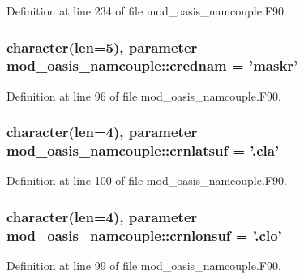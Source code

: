 Definition at line 234 of file mod\+\_\+oasis\+\_\+namcouple.\+F90.

\hypertarget{classmod__oasis__namcouple_a161fc23acf442c75c9d6ba7758937d59}{
\subsubsection[{crednam}]{\setlength{\rightskip}{0pt plus 5cm}character(len=5), parameter mod\+\_\+oasis\+\_\+namcouple\+::crednam = 'maskr'\hspace{0.3cm}{\ttfamily [private]}}}\label{classmod__oasis__namcouple_a161fc23acf442c75c9d6ba7758937d59}


Definition at line 96 of file mod\+\_\+oasis\+\_\+namcouple.\+F90.

\hypertarget{classmod__oasis__namcouple_acdc7f0d582616ee9e18470aad433ed3a}{
\subsubsection[{crnlatsuf}]{\setlength{\rightskip}{0pt plus 5cm}character(len=4), parameter mod\+\_\+oasis\+\_\+namcouple\+::crnlatsuf = '.cla'\hspace{0.3cm}{\ttfamily [private]}}}\label{classmod__oasis__namcouple_acdc7f0d582616ee9e18470aad433ed3a}


Definition at line 100 of file mod\+\_\+oasis\+\_\+namcouple.\+F90.

\hypertarget{classmod__oasis__namcouple_ae56f031c6d9a819a39fe5170f42d7ce1}{
\subsubsection[{crnlonsuf}]{\setlength{\rightskip}{0pt plus 5cm}character(len=4), parameter mod\+\_\+oasis\+\_\+namcouple\+::crnlonsuf = '.clo'\hspace{0.3cm}{\ttfamily [private]}}}\label{classmod__oasis__namcouple_ae56f031c6d9a819a39fe5170f42d7ce1}


Definition at line 99 of file mod\+\_\+oasis\+\_\+namcouple.\+F90.

